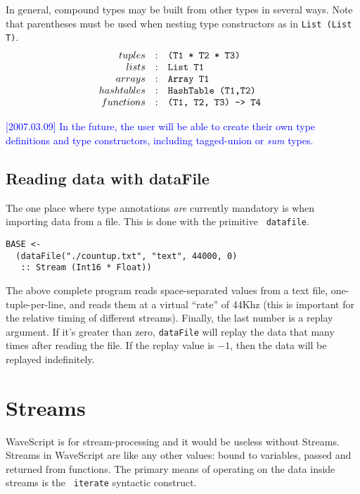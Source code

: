 \documentclass[twocolumn]{report}
\newcommand{\rednote}[1]{{\textcolor{blue}{#1}}}
\begin{document}
In general, compound types may be built from other types in several
ways.  Note that parentheses must be used when nesting type
constructors as in {\tt List (List T)}.
\[
\begin{array}{rcl}
tuples           & : & $\tt (T1 * T2 * T3) $   \\
lists            & : & $\tt List T1 $ \\
arrays           & : & $\tt Array T1 $ \\
hashtables       & : & $\tt HashTable (T1,T2) $ \\
functions        & : & $\tt (T1, T2, T3) -> T4 $ \\
\end{array}
\]

\rednote{[2007.03.09] In the future, the user will be able to create
  their own type definitions and type constructors, including
  tagged-union or {\em sum} types.}


\subsection{Reading data with dataFile}

The one place where type annotations {\em are} currently mandatory is
when importing data from a file.  This is done with the primitive {\tt
datafile}.
%
\begin{verbatim}
BASE <- 
  (dataFile("./countup.txt", "text", 44000, 0) 
   :: Stream (Int16 * Float))
\end{verbatim}

The above complete program reads space-separated values from a text
file, one-tuple-per-line, and reads them at a virtual ``rate'' of
44Khz (this is important for the relative timing of different
streams).  Finally, the last number is a replay argument.  If it's greater
than zero, {\tt dataFile} will replay the data that many times after
reading the file.  If the replay value is $-1$, then the data will be
replayed indefinitely.





\section{Streams}

WaveScript is for stream-processing and it would be useless without
Streams.  
Streams in WaveScript are like any other values: bound to variables,
passed and returned from functions.
The primary means of operating on the data inside streams is the {\tt
  iterate} syntactic construct.
\end{document}
